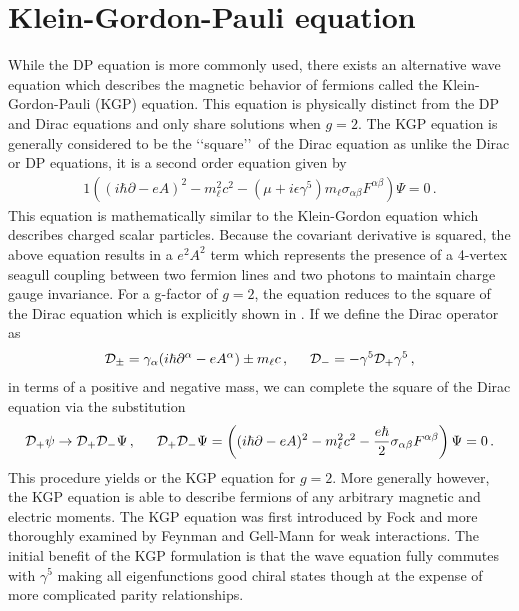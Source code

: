 \section{Klein-Gordon-Pauli equation}
\noindent While the DP equation is more commonly used, there exists an alternative wave equation which describes the magnetic behavior of fermions called the Klein-Gordon-Pauli (KGP) equation. This equation is physically distinct from the DP and Dirac equations and only share solutions when $g=2$. The KGP equation is generally considered to be the \lq\lq square\rq\rq\ of the Dirac equation as unlike the Dirac or DP equations, it is a second order equation given by
\begin{alignat}{1}
	\label{eq:kgp:01} \left((i\hbar\partial-eA)^{2}-m_{\ell}^{2}c^{2}-\left(\mu+i\epsilon\gamma^{5}\right)m_{\ell}\sigma_{\alpha\beta}F^{\alpha\beta}\right)\Psi=0\,.
\end{alignat}
This equation is mathematically similar to the Klein-Gordon equation which describes charged scalar particles. Because the covariant derivative is squared, the above equation results in a $e^{2}A^{2}$ term which represents the presence of a 4-vertex seagull coupling between two fermion lines and two photons to maintain charge gauge invariance. For a g-factor of $g=2$, the equation reduces to the square of the Dirac equation which is explicitly shown in . If we define the Dirac operator as
\begin{alignat}{1}
	\label{eq:kgp:02} \mathcal{D}_{\pm}=\gamma_{\alpha}(i\hbar\partial^{\alpha}-eA^{\alpha})\pm m_{\ell}c\,,\indent\mathcal{D}_{-}=-\gamma^{5}\mathcal{D}_{+}\gamma^{5}\,,
\end{alignat}
in terms of a positive and negative mass, we can complete the square of the Dirac equation via the substitution
\begin{alignat}{1}
	\label{eq:kgp:03} \mathcal{D}_{+}\psi\rightarrow\mathcal{D}_{+}\mathcal{D}_{-}\Psi\,,\indent\mathcal{D}_{+}\mathcal{D}_{-}\Psi=\left((i\hbar\partial-eA)^{2}-m_{\ell}^{2}c^{2}-\frac{e\hbar}{2}\sigma_{\alpha\beta}F^{\alpha\beta}\right)\Psi=0\,.
\end{alignat}
This procedure yields  or the KGP equation for $g=2$. More generally however, the KGP equation is able to describe fermions of any arbitrary magnetic and electric moments. The KGP equation was first introduced by Fock \cite{Fock:1937dy} and more thoroughly examined by Feynman and Gell-Mann \cite{Feynman:1958ty} for weak interactions. The initial benefit of the KGP formulation is that the wave equation fully commutes with $\gamma^{5}$ making all eigenfunctions good chiral states though at the expense of more complicated parity relationships.

